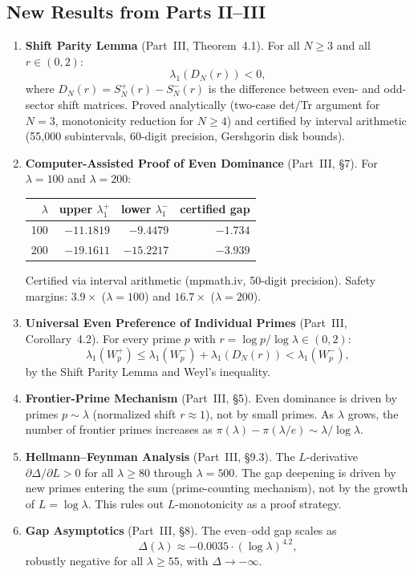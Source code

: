 \documentclass[12pt,a4paper]{article}
\theoremstyle{definition}
\theoremstyle{remark}
\begin{document}
\subsection{New Results from Parts II--III}

\begin{enumerate}[label=\textbf{N\arabic*},leftmargin=3em]
  \item \textbf{Shift Parity Lemma} (Part~III, Theorem~4.1). For all $N \geq 3$ and all $r \in (0,2)$:
  \[ \lambda_1(D_N(r)) < 0, \]
  where $D_N(r) = S_N^+(r) - S_N^-(r)$ is the difference between even- and odd-sector shift matrices. Proved analytically (two-case det/Tr argument for $N=3$, monotonicity reduction for $N \geq 4$) and certified by interval arithmetic (55,000 subintervals, 60-digit precision, Gershgorin disk bounds).

  \item \textbf{Computer-Assisted Proof of Even Dominance} (Part~III, \S7). For $\lambda = 100$ and $\lambda = 200$:
  \begin{center}
  \renewcommand{\arraystretch}{1.15}
  \begin{tabular}{r|r|r|r}
  $\lambda$ & upper $\lambda_1^+$ & lower $\lambda_1^-$ & certified gap \\\hline
  100 & $-11.1819$ & $-9.4479$ & $-1.734$ \\
  200 & $-19.1611$ & $-15.2217$ & $-3.939$
  \end{tabular}
  \end{center}
  Certified via interval arithmetic (mpmath.iv, 50-digit precision). Safety margins: $3.9\times$ ($\lambda = 100$) and $16.7\times$ ($\lambda = 200$).

  \item \textbf{Universal Even Preference of Individual Primes} (Part~III, Corollary~4.2). For every prime $p$ with $r = \log p / \log\lambda \in (0,2)$:
  \[ \lambda_1(W_p^+) \leq \lambda_1(W_p^-) + \lambda_1(D_N(r)) < \lambda_1(W_p^-), \]
  by the Shift Parity Lemma and Weyl's inequality.

  \item \textbf{Frontier-Prime Mechanism} (Part~III, \S5). Even dominance is driven by primes $p \sim \lambda$ (normalized shift $r \approx 1$), not by small primes. As $\lambda$ grows, the number of frontier primes increases as $\pi(\lambda) - \pi(\lambda/e) \sim \lambda/\log\lambda$.

  \item \textbf{Hellmann--Feynman Analysis} (Part~III, \S9.3). The $L$-derivative $\partial\Delta/\partial L > 0$ for all $\lambda \geq 80$ through $\lambda = 500$. The gap deepening is driven by new primes entering the sum (prime-counting mechanism), not by the growth of $L = \log\lambda$. This rules out $L$-monotonicity as a proof strategy.

  \item \textbf{Gap Asymptotics} (Part~III, \S8). The even--odd gap scales as
  \[ \Delta(\lambda) \approx -0.0035 \cdot (\log\lambda)^{4.2}, \]
  robustly negative for all $\lambda \geq 55$, with $\Delta \to -\infty$.
\end{enumerate}
\end{document}
